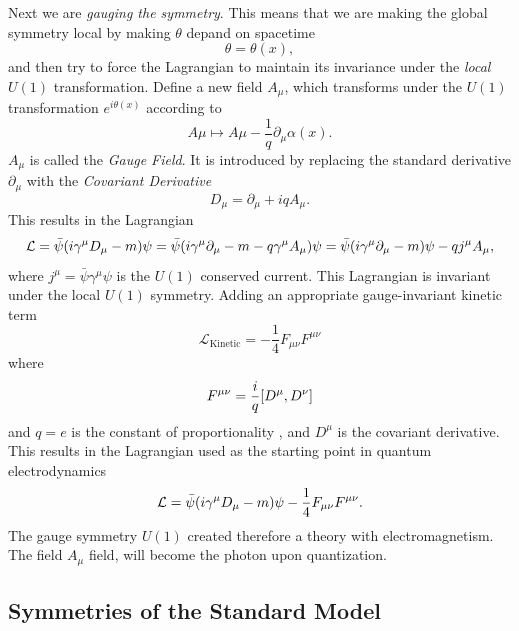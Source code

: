 Next we are \emph{gauging the symmetry}. This means that we are making the global symmetry local by making $\theta$ depand on spacetime
\begin{equation}
\theta=\theta(x),
\end{equation}
and then try to force the Lagrangian to maintain its invariance under the \emph{local} $U(1)$ transformation. Define a new field $A_{\mu}$, which transforms under the $U(1)$ transformation $e^{i\theta(x)}$ according to
\begin{equation}
A\mu\mapsto A\mu-\frac{1}{q}\partial_{\mu}\alpha(x).
\end{equation}
$A_{\mu}$ is called the \emph{Gauge Field}. It is introduced by replacing the standard derivative $\partial_{\mu}$ with the \emph{Covariant Derivative}
\begin{equation}
D_{\mu}=\partial_{\mu}+iqA_{\mu}.
\end{equation}
This results in the Lagrangian
\begin{equation}
\mathcal{L}=\bar{\psi}\qty(i\gamma^{\mu}D_{\mu}-m)\psi=\bar{\psi}\qty(i\gamma^{\mu}\partial_{\mu}-m-q\gamma^{\mu}A_{\mu})\psi=\bar{\psi}\qty(i\gamma^{\mu}\partial_{\mu}-m)\psi-qj^{\mu}A_{\mu},
\end{equation}
where $j^{\mu}=\bar{\psi}\gamma^{\mu}\psi$ is the $U(1)$ conserved current. This Lagrangian is invariant under the local $U(1)$ symmetry. Adding an appropriate gauge-invariant kinetic term 
\begin{equation}
\mathcal{L}_{\textrm{Kinetic}}=-\frac{1}{4}F_{\mu\nu}F^{\mu\nu}
\end{equation}
where
\begin{equation}
F^{\mu\nu}=\frac{i}{q}\comm{D^\mu}{D^\nu}
\end{equation}
and $q=e$ is the constant of proportionality , and $D^\mu$ is the covariant derivative. This results in the Lagrangian used as the starting point in quantum electrodynamics
\begin{equation}
\mathcal{L}=\bar{\psi}\qty(i\gamma^{\mu}D_{\mu}-m)\psi-\frac{1}{4}F_{\mu\nu}F^{\mu\nu}.
\end{equation}
The gauge symmetry $U(1)$ created therefore a theory with electromagnetism. The field $A_{\mu}$ field, will become the photon upon quantization.

\subsection{Symmetries of the Standard Model}
\label{symmetries-of-the-standard-model}

